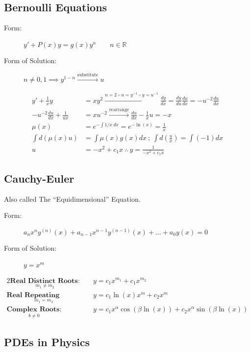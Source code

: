 \subsection{Bernoulli Equations}
    \begin{description}
        \item [\rm Form:] $\boxed{\displaystyle y'+P(x)y=g(x)y^n}\qquad n\in\mathbb{R}$
        \item [\rm Form of Solution:] $\boxed{n\neq0,1\implies y^{1-n}\xrightarrow{\text{substitute}}u}$
    \end{description}
    \begin{align*}
        y'+\frac{1}{x}y&=xy^2\xrightarrow{n=2\ \therefore\ u=y^{-1}\ \therefore\ y=u^{-1}} \frac{dy}{dx}=\frac{dy}{du}\frac{du}{dx}=-u^{-2}\frac{du}{dx}\\
        -u^{-2}\frac{du}{dx}+\frac{1}{ux}&=xu^{-2}\xrightarrow{\text{rearrange}}\frac{du}{dx}-\frac{1}{x}u=-x\\
        \mu(x)&=e^{-\int 1/x\ dx}=e^{-\ln(x)}=\frac{1}{x}\\
        \int d(\mu(x)u)&=\int \mu(x)g(x)dx\ ;\ \int d\left(\frac{u}{x}\right)=\int (-1)dx\\
        u&=-x^2+c_1x\ \therefore\ \boxed{y=\frac{1}{-x^2+c_1x}}
        \end{align*}
\subsection*{Cauchy-Euler}
    Also called The ``Equidimensional'' Equation. 
    \begin{description}
        \item [\rm Form:] $\boxed{\displaystyle a_{n}x^{n}y^{(n)}(x)+a_{n-1}x^{n-1}y^{(n-1)}(x)+\dots +a_{0}y(x)=0}$
        \item [\rm Form of Solution:] $\boxed{y=x^m}$
    \end{description}
    
    \begin{alignat}{2}
        \underset { m_1 \neq m_2}{\textbf{Real Distinct Roots:}}
        &\quad y=c_1x^{m_1}+c_1x^{m_2}\\[0.7 cm]
        \underset{m_1=m_2}{\textbf{Real Repeating Roots:}}
        &\quad y=c_1\ln(x)x^m+c_2x^m\\[0.7 cm]
        \underset{b \neq 0}{\textbf{Complex Roots:}}
        &\quad y=c_{1}x^{\alpha }\cos(\beta \ln(x))+c_{2}x^{\alpha }\sin(\beta \ln(x))
    \end{alignat}
    \subsection{PDEs in Physics} 
